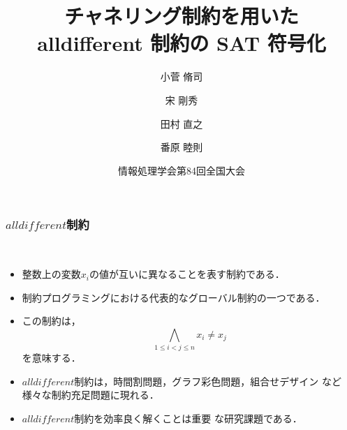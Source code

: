 \documentclass [dvipdfmx,11pt]{beamer}
\title{チャネリング制約を用いた\\ alldifferent 制約の SAT 符号化}
\author{小菅 脩司\inst{1} \and 宋 剛秀\inst{2} \and 田村 直之\inst{2} \and 番原 睦則\inst{1}}
\institute{ \inst{1}名古屋大学 \ \  \inst{2}神戸大学 }
\date{情報処理学会第84回全国大会}
\newcommand{\alldifferent}{$alldifferent$}
\begin{document}
\begin{frame} {}
    \titlepage
\end{frame}


\begin{frame}
  \frametitle{{\alldifferent}制約}
  \begin{alertblock}{}\centering
    \alert{}\\[1em]
    \begin{itemize}
    \item 整数上の変数$x_{i}$の値が互いに異なることを表す制約である．
    \item 制約プログラミングにおける代表的なグローバル制約の一つである．
    \end{itemize}
  \end{alertblock}
  \begin{itemize}
  \item この制約は，
    $$\bigwedge_{1 \leq i < j \leq n} x_i \neq x_j$$
    を意味する．
  \item {\alldifferent}制約は，時間割問題，グラフ彩色問題，組合せデザイン
    など様々な制約充足問題に現れる．
  \item {\alldifferent}制約を効率良く解くことは重要
    な研究課題である．
  \end{itemize}
\end{frame}
\end{document}
